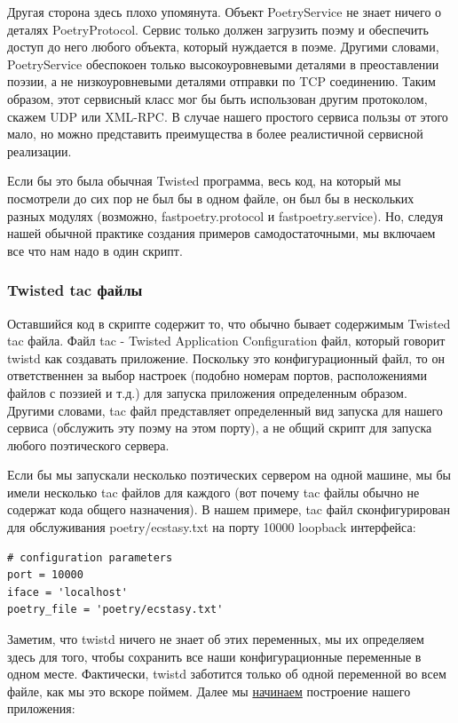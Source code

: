 Другая сторона здесь плохо упомянута. Объект PoetryService 
не знает ничего о деталях PoetryProtocol. Сервис только 
должен загрузить поэму и обеспечить доступ до него любого 
объекта, который нуждается в поэме. Другими словами, 
PoetryService обеспокоен только высокоуровневыми деталями 
в преоставлении поэзии, а не низкоуровневыми деталями 
отправки по TCP соединению. Таким образом, этот сервисный 
класс мог бы быть использован другим протоколом, скажем UDP или 
XML-RPC. В случае нашего простого сервиса пользы от этого мало, 
но можно представить преимущества в более реалистичной сервисной реализации. 


Если бы это была обычная Twisted программа, весь код, 
на который мы посмотрели до сих пор не был бы в одном файле, 
он был бы в нескольких разных модулях (возможно, 
fastpoetry.protocol и fastpoetry.service). Но, следуя нашей 
обычной практике создания примеров самодостаточными, мы 
включаем все что нам надо в один скрипт.

\subsubsection{Twisted tac файлы}

Оставшийся код в скрипте содержит то, 
что обычно бывает содержимым Twisted tac файла. 
Файл tac - Twisted Application Configuration файл, который 
говорит twistd как создавать приложение. Поскольку это 
конфигурационный файл, то он ответственнен за выбор настроек (подобно 
номерам портов, расположениями файлов с поэзией и т.д.) для 
запуска приложения определенным образом. Другими словами, 
tac файл представляет определенный вид запуска для нашего сервиса (обслужить 
эту поэму на этом порту), а не общий скрипт для 
запуска любого поэтического сервера.


Если бы мы запускали несколько поэтических сервером на одной 
машине, мы бы имели несколько tac файлов для каждого (вот почему 
tac файлы обычно не содержат кода общего назначения). В нашем примере, 
tac файл сконфигурирован для обслуживания poetry/ecstasy.txt на 
порту 10000 loopback интерфейса:

\begin{scriptsize}\begin{verbatim}
# configuration parameters
port = 10000
iface = 'localhost'
poetry_file = 'poetry/ecstasy.txt'
\end{verbatim}\end{scriptsize}


Заметим, что twistd ничего не знает об этих переменных, 
мы их определяем здесь для того, чтобы сохранить все наши 
конфигурационные переменные в одном месте. Фактически, twistd заботится 
только об одной переменной во всем файле, как мы это вскоре поймем. 
Далее мы \href{http://github.com/jdavisp3/twisted-intro/blob/master/twisted-server-3/fastpoetry.py#L44}{начинаем} построение нашего приложения:

